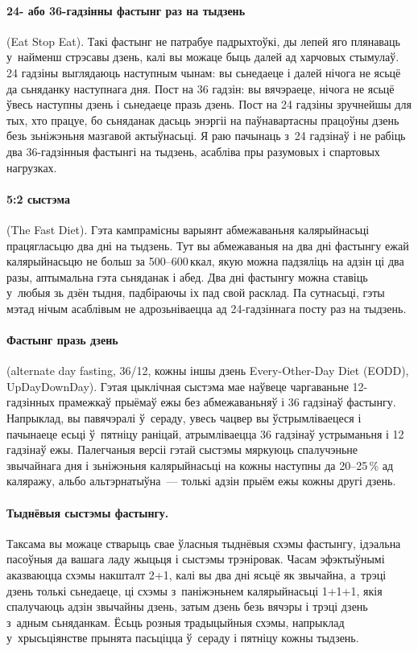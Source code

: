 \paragraph{24- або 36-гадзінны фастынг раз на тыдзень} (Eat Stop Eat).
Такі фастынг не патрабуе падрыхтоўкі, ды лепей яго плянаваць у~найменш стрэсавы дзень, калі вы можаце быць далей ад харчовых стымулаў. 24 гадзіны выглядаюць наступным чынам: вы сьнедаеце і далей нічога не ясьцё да сьняданку наступнага дня. Пост на 36 гадзін: вы вячэраеце, нічога не ясьцё ўвесь наступны дзень і сьнедаеце празь дзень. Пост на 24 гадзіны зручнейшы для тых, хто працуе, бо сьняданак дасьць энэргіі на паўнавартасны працоўны дзень безь зьніжэньня мазгавой актыўнасьці. Я раю пачынаць з~24 гадзінаў і не рабіць два 36-гадзінныя фастынгі на тыдзень, асабліва пры разумовых і спартовых нагрузках.

\paragraph{5:2 сыстэма} (The Fast Diet).
Гэта кампрамісны варыянт абмежаваньня калярыйнасьці працягласьцю два дні на тыдзень. Тут вы абмежаваныя на два дні фастынгу ежай калярыйнасьцю не больш за 500--600\,ккал, якую можна падзяліць на адзін ці два разы, аптымальна гэта сьняданак і абед. Два дні фастынгу можна ставіць у~любыя зь дзён тыдня, падбіраючы іх пад свой расклад. Па сутнасьці, гэты мэтад нічым асаблівым не адрозьніваецца ад 24-гадзіннага посту раз на тыдзень.

\paragraph{Фастынг празь дзень} (alternate day fasting, 36/12, кожны іншы дзень Every-Other-Day Diet (EODD), UpDayDownDay).
Гэтая цыклічная сыстэма мае наўвеце чаргаваньне 12-гадзінных прамежкаў прыёмаў ежы без абмежаваньняў і 36 гадзінаў фастынгу. Напрыклад, вы павячэралі ў~сераду, увесь чацвер вы ўстрымліваецеся і пачынаеце есьці ў~пятніцу раніцай, атрымліваецца 36 гадзінаў устрыманьня і 12 гадзінаў ежы. Палегчаныя версіі гэтай сыстэмы мяркуюць спалучэньне звычайнага дня і зьніжэньня калярыйнасьці на кожны наступны да 20--25\,\% ад каляражу, альбо альтэрнатыўна~--- толькі адзін прыём ежы кожны другі дзень.

\paragraph{Тыднёвыя сыстэмы фастынгу.}
Таксама вы можаце стварыць свае ўласныя тыднёвыя схэмы фастынгу, ідэальна пасоўныя да вашага ладу жыцьця і сыстэмы трэніровак. Часам эфэктыўнымі аказваюцца схэмы накшталт 2+1, калі вы два дні ясьцё як звычайна, а~трэці дзень толькі сьнедаеце, ці схэмы з~паніжэньнем калярыйнасьці 1+1+1, якія спалучаюць адзін звычайны дзень, затым дзень безь вячэры і трэці дзень з~адным сьняданкам. Ёсьць розныя традыцыйныя схэмы, напрыклад у~хрысьціянстве прынята пасьціцца ў~сераду і пятніцу кожны тыдзень.

